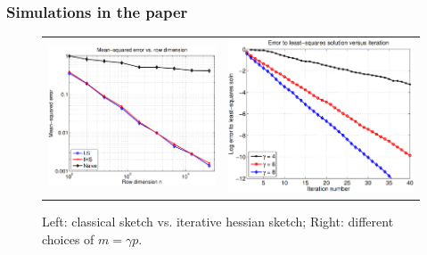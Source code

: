 \documentclass{beamer}
\begin{document}
\begin{frame}
    \frametitle{Simulations in the paper}
    \begin{figure}
        \begin{center}
            \begin{tabular}{ll}
                \includegraphics[scale=0.22]{ihs_paper_mse_vs_n_ihs_naive_compare.png}
                &
                \includegraphics[scale=0.20]{ihs_paper_mse_vs_iter_ihs_diff_m.png}
            \end{tabular}
            \caption{Left: classical sketch vs. iterative hessian sketch;
            Right: different choices of $m=\gamma p$.}
        \end{center}
    \end{figure}
\end{frame}
\end{document}
